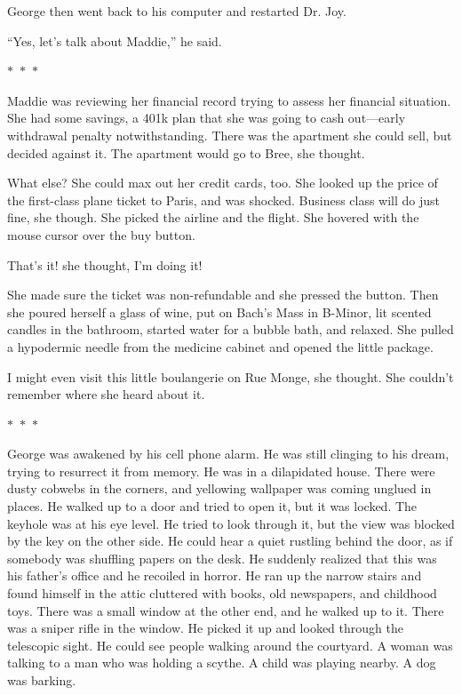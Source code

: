 \documentclass{memoir}
\newcommand{\starbreak}{%
\begin{center}
  $\ast$~$\ast$~$\ast$
\end{center}
}
\begin{document}
George then went back to his computer and restarted Dr. Joy.

``Yes, let's talk about Maddie,'' he said.

\starbreak

Maddie was reviewing her financial record trying to assess her financial situation. She had some savings, a 401k plan that she was going to cash out---early withdrawal penalty notwithstanding. There was the apartment she could sell, but decided against it. The apartment would go to Bree, she thought. 

What else? She could max out her credit cards, too. She looked up the price of the first-class plane ticket to Paris, and was shocked. Business class will do just fine, she though. She picked the airline and the flight. She hovered with the mouse cursor over the buy button. 

That's it! she thought, I'm doing it! 

She made sure the ticket was non-refundable and she pressed the button. Then she poured herself a glass of wine, put on Bach's Mass in B-Minor, lit scented candles in the bathroom, started water for a bubble bath, and relaxed. She pulled a hypodermic needle from the medicine cabinet and opened the little package.

I might even visit this little boulangerie on Rue Monge, she thought. She couldn't remember where she heard about it.

\starbreak

George was awakened by his cell phone alarm. He was still clinging to his dream, trying to resurrect it from memory. He was in a dilapidated house. There were dusty cobwebs in the corners, and yellowing wallpaper was coming unglued in places. He walked up to a door and tried to open it, but it was locked. The keyhole was at his eye level. He tried to look through it, but the view was blocked by the key on the other side. He could hear a quiet rustling behind the door, as if somebody was shuffling papers on the desk. He suddenly realized that this was his father's office and he recoiled in horror. He ran up the narrow stairs and found himself in the attic cluttered with books, old newspapers, and childhood toys. There was a small window at the other end, and he walked up to it. There was a sniper rifle in the window. He picked it up and looked through the telescopic sight. He could see people walking around the courtyard. A woman was talking to a man who was holding a scythe. A child was playing nearby. A dog was barking. 
\end{document}
